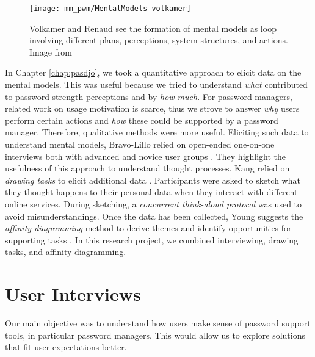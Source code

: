 \begin{figure}
	\centering
	\texttt{[image: mm\_pwm/MentalModels-volkamer]}
	\caption{\label{fig:mm_pwm:mental-model-volkamer} Volkamer and Renaud see the formation of mental models as loop involving different plans, perceptions, system structures, and actions. Image from \cite{Volkamer2013MentalModels}}
\end{figure}
In Chapter \ref{chap:pasdjo}, we took a quantitative approach to elicit data on the mental models. This was useful because we tried to understand \textit{what} contributed to password strength perceptions and by \textit{how much}. For password managers, related work on usage motivation is scarce, thus we strove to answer \textit{why} users perform certain actions and \textit{how} these could be supported by a password manager. Therefore, qualitative methods were more useful. 
Eliciting such data to understand mental models, Bravo-Lillo \etal relied on open-ended one-on-one interviews both with advanced and novice user groups \cite{BravoLillo2011WarningsMentalModel}. They highlight the usefulness of this approach to understand thought processes. Kang \etal relied on \textit{drawing tasks} to elicit additional data \cite{Kang2015MentalModelsDrawing}. Participants were asked to sketch what they thought happens to their personal data when they interact with different online services. During sketching, a \textit{concurrent think-aloud protocol} was used to avoid misunderstandings. Once the data has been collected, Young suggests the \textit{affinity diagramming} method to derive themes and identify opportunities for supporting tasks \cite{Young2008}. In this research project, we combined interviewing, drawing tasks, and affinity diagramming. 

\section{User Interviews}
Our main objective was to understand how users make sense of password support tools, in particular password managers. This would allow us to explore solutions that fit user expectations better.  

